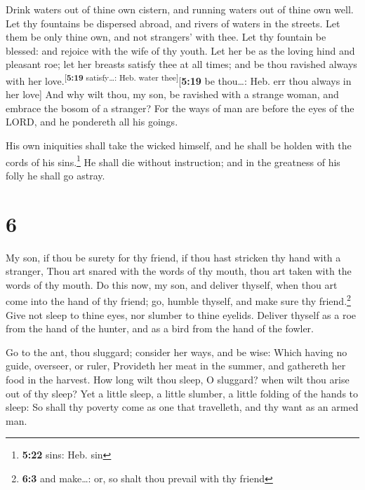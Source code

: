  Drink waters out of thine own cistern, and running
waters out of thine own well.  Let thy fountains be
dispersed abroad, and rivers of waters in the streets. 
Let them be only thine own, and not strangers' with thee.
 Let thy fountain be blessed: and rejoice with the wife
of thy youth.  Let her be as the loving hind and pleasant
roe; let her breasts satisfy thee at all times; and be thou ravished
always with her love.\textsuperscript{{[}\textbf{5:19} satisfy\ldots:
Heb. water thee{]}}{[}\textbf{5:19} be thou\ldots: Heb. err thou always
in her love{]}  And why wilt thou, my son, be ravished
with a strange woman, and embrace the bosom of a stranger?
 For the ways of man are before the eyes of the LORD, and
he pondereth all his goings.

 His own iniquities shall take the wicked himself, and he
shall be holden with the cords of his sins.\footnote{\textbf{5:22} sins:
  Heb. sin}  He shall die without instruction; and in the
greatness of his folly he shall go astray.

\hypertarget{section-5}{%
\section{6}\label{section-5}}

 My son, if thou be surety for thy friend, if thou hast
stricken thy hand with a stranger,  Thou art snared with
the words of thy mouth, thou art taken with the words of thy mouth.
 Do this now, my son, and deliver thyself, when thou art
come into the hand of thy friend; go, humble thyself, and make sure thy
friend.\footnote{\textbf{6:3} and make\ldots: or, so shalt thou prevail
  with thy friend}  Give not sleep to thine eyes, nor
slumber to thine eyelids.  Deliver thyself as a roe from
the hand of the hunter, and as a bird from the hand of the fowler.

 Go to the ant, thou sluggard; consider her ways, and be
wise:  Which having no guide, overseer, or ruler,
 Provideth her meat in the summer, and gathereth her food
in the harvest.  How long wilt thou sleep, O sluggard?
when wilt thou arise out of thy sleep?  Yet a little
sleep, a little slumber, a little folding of the hands to sleep:
 So shall thy poverty come as one that travelleth, and
thy want as an armed man.

